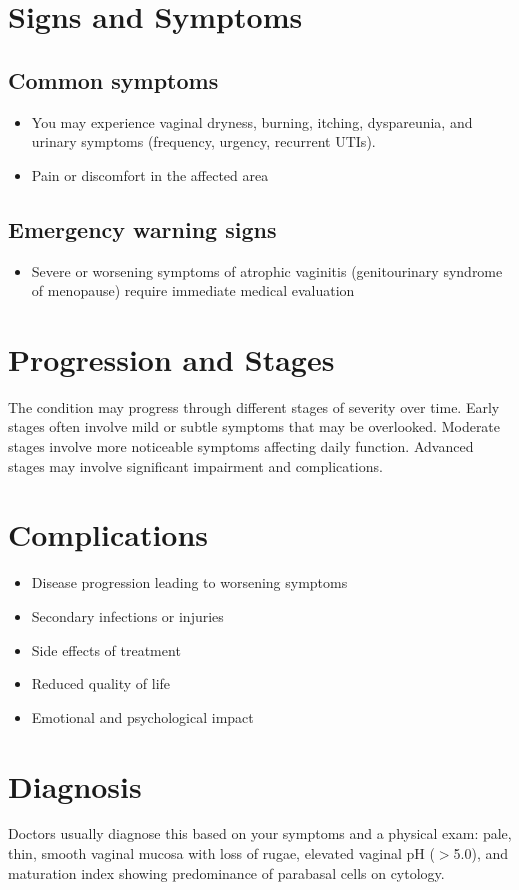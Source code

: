 \section{Signs and Symptoms}

\subsection{Common symptoms}
\begin{itemize}[noitemsep]
  \item You may experience vaginal dryness, burning, itching, dyspareunia, and urinary symptoms (frequency, urgency, recurrent UTIs).

  \item Pain or discomfort in the affected area
  \end{itemize}

\subsection{Emergency warning signs}
\begin{itemize}[noitemsep]
  \item Severe or worsening symptoms of atrophic vaginitis (genitourinary syndrome of menopause) require immediate medical evaluation
\end{itemize}
\section{Progression and Stages}
The condition may progress through different stages of severity over time. Early stages often involve mild or subtle symptoms that may be overlooked. Moderate stages involve more noticeable symptoms affecting daily function. Advanced stages may involve significant impairment and complications.
\section{Complications}
\begin{itemize}[noitemsep]
  \item Disease progression leading to worsening symptoms
  \item Secondary infections or injuries
  \item Side effects of treatment
  \item Reduced quality of life
  \item Emotional and psychological impact
\end{itemize}
\section{Diagnosis}
Doctors usually diagnose this based on your symptoms and a physical exam: pale, thin, smooth vaginal mucosa with loss of rugae, elevated vaginal pH ($>$5.0), and maturation index showing predominance of parabasal cells on cytology.

